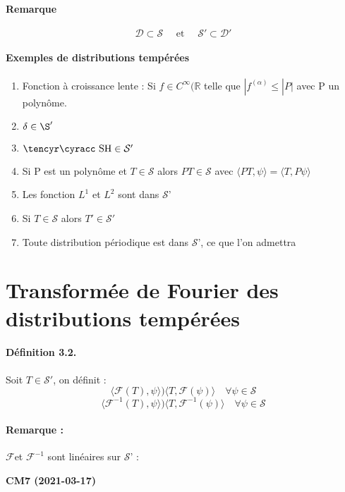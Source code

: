 \documentclass[12pt,a4paper]{report}
\newcommand{\ens}[1]{\ensuremath{\mathbb{#1}}}
\newcommand{\D}{\ensuremath{\mathcal{D}}}
\newcommand{\F}{\ensuremath{\mathcal{F}}}
\newcommand{\Sf}{\ensuremath{\mathcal{S}}}
\def\cyr{\tencyr\cyracc}
\def\dc{\mbox{\cyr SH}}
\begin{document}
\paragraph{Remarque}

\[
	\D \subset \Sf \quad \text{ et } \quad \Sf' \subset \D'
\]

\paragraph{Exemples de distributions tempérées}

\begin{enumerate}
	\item Fonction à croissance lente : Si \(f \in C^\infty (\ens{R}\) telle que \(|f^{(\alpha)} \leq |P|\) avec P un polynôme.
	\item \(\delta \in \S'\)
	\item \(\dc \in \Sf'\)
	\item Si P est un polynôme et \(T \in \Sf\) alors \(PT \in \Sf\) avec \(\langle PT, \psi \rangle = \langle T, P \psi \rangle\)
	\item Les fonction \(L^1\) et \(L^2\) sont dans \Sf'
	\item Si \(T \in \Sf\) alors \(T' \in \Sf'\)
	\item Toute distribution périodique est dans \Sf', ce que l'on admettra
\end{enumerate}

\section{Transformée de Fourier des distributions tempérées}

\paragraph{Définition 3.2.} Soit \(T \in \Sf'\), on définit :
\[
	\langle \F(T), \psi \rangle ) \langle T, \F(\psi) \rangle \quad \forall \psi \in \Sf
\]
\[
	\langle \F^{-1}(T), \psi \rangle ) \langle T, \F^{-1}(\psi) \rangle \quad \forall \psi \in \Sf
\]

\paragraph{Remarque :} \F et \(\F^{-1}\) sont linéaires sur \Sf' :

\begin{center}
\textbf{CM7 (2021-03-17)}
\end{center}
\end{document}
